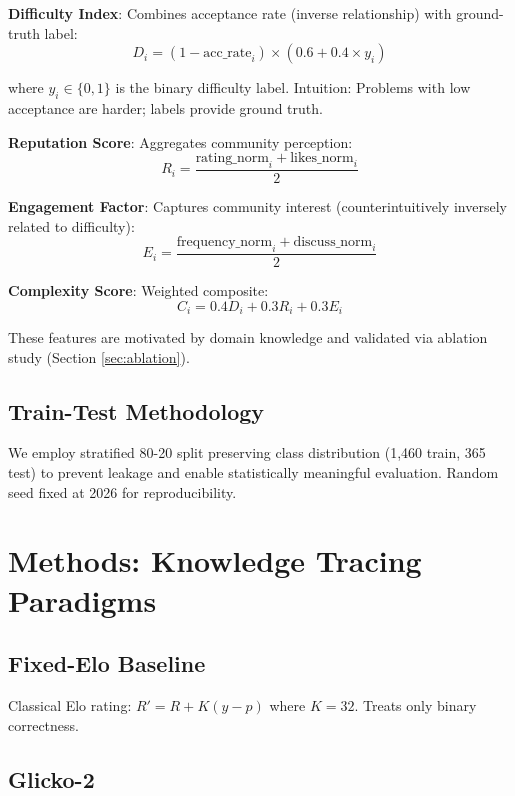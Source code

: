\documentclass[conference]{IEEEtran}
\begin{document}
\textbf{Difficulty Index}: Combines acceptance rate (inverse relationship) with ground-truth label:
\begin{equation}
D_i = (1 - \text{acc\_rate}_i) \times (0.6 + 0.4 \times y_i)
\end{equation}

where $y_i \in \{0,1\}$ is the binary difficulty label. Intuition: Problems with low acceptance are harder; labels provide ground truth.

\textbf{Reputation Score}: Aggregates community perception:
\begin{equation}
R_i = \frac{\text{rating\_norm}_i + \text{likes\_norm}_i}{2}
\end{equation}

\textbf{Engagement Factor}: Captures community interest (counterintuitively inversely related to difficulty):
\begin{equation}
E_i = \frac{\text{frequency\_norm}_i + \text{discuss\_norm}_i}{2}
\end{equation}

\textbf{Complexity Score}: Weighted composite:
\begin{equation}
C_i = 0.4 D_i + 0.3 R_i + 0.3 E_i
\end{equation}

These features are motivated by domain knowledge and validated via ablation study (Section \ref{sec:ablation}).

\subsection{Train-Test Methodology}

We employ stratified 80-20 split preserving class distribution (1,460 train, 365 test) to prevent leakage and enable statistically meaningful evaluation. Random seed fixed at 2026 for reproducibility.

\section{Methods: Knowledge Tracing Paradigms}

\subsection{Fixed-Elo Baseline}

Classical Elo rating: $R' = R + K(y - p)$ where $K=32$. Treats only binary correctness.

\subsection{Glicko-2}
\end{document}
